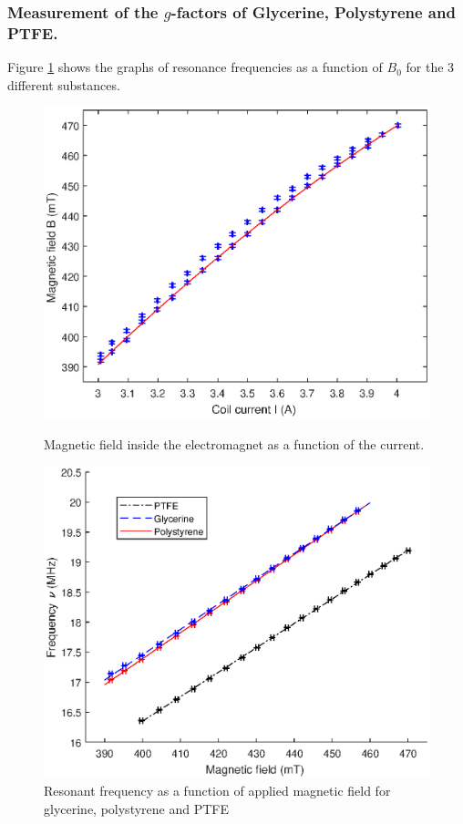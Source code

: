 \documentclass[a4paper]{jpconf}
\numberwithin{equation}{section}
\begin{document}
\subsubsection{Measurement of the $g$-factors of Glycerine, Polystyrene and PTFE.}

Figure \ref{fig: NMR resonances} shows the graphs of resonance frequencies as a function of $B_0$ for the 3 different substances.%

\begin{figure}[htbp]
	\begin{minipage}[b]{2.9in}
		\includegraphics[scale=0.55]{NMR_calibration.eps}
		\caption{Magnetic field inside the electromagnet as a function of the current.}
		\label{fig: hysteresis curve}
	\end{minipage}
	\hspace{1.5pc}
	\begin{minipage}[b]{3.1in}
		\includegraphics[scale=0.55]{NMR_resonances.eps}
		\caption{Resonant frequency as a function of applied magnetic field for glycerine, polystyrene and PTFE}
		\label{fig: NMR resonances}
	\end{minipage}
\end{figure}
\end{document}
